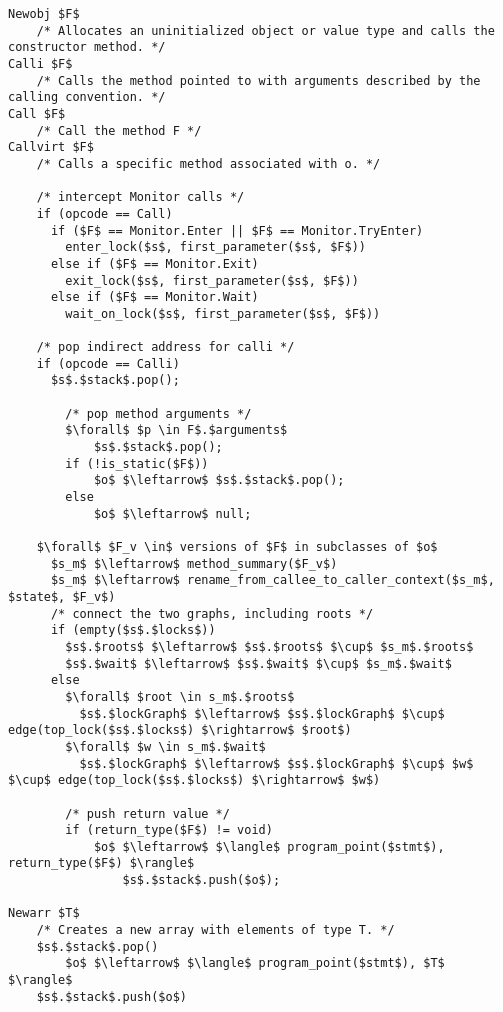 \begin{lstlisting}[language=CSharp,mathescape,caption=Data-flow rules for calls and object creation,label=fig:rulesCallAndNew,float]
Newobj $F$
    /* Allocates an uninitialized object or value type and calls the constructor method. */
Calli $F$
    /* Calls the method pointed to with arguments described by the calling convention. */
Call $F$
    /* Call the method F */
Callvirt $F$
    /* Calls a specific method associated with o. */

    /* intercept Monitor calls */
    if (opcode == Call)
      if ($F$ == Monitor.Enter || $F$ == Monitor.TryEnter)
        enter_lock($s$, first_parameter($s$, $F$))
      else if ($F$ == Monitor.Exit)
        exit_lock($s$, first_parameter($s$, $F$))
      else if ($F$ == Monitor.Wait)
        wait_on_lock($s$, first_parameter($s$, $F$))

    /* pop indirect address for calli */
    if (opcode == Calli)
      $s$.$stack$.pop();
        
		/* pop method arguments */
		$\forall$ $p \in F$.$arguments$
			$s$.$stack$.pop();
		if (!is_static($F$))
			$o$ $\leftarrow$ $s$.$stack$.pop();
		else
			$o$ $\leftarrow$ null;

    $\forall$ $F_v \in$ versions of $F$ in subclasses of $o$
      $s_m$ $\leftarrow$ method_summary($F_v$)
      $s_m$ $\leftarrow$ rename_from_callee_to_caller_context($s_m$, $state$, $F_v$) 
      /* connect the two graphs, including roots */
      if (empty($s$.$locks$))
        $s$.$roots$ $\leftarrow$ $s$.$roots$ $\cup$ $s_m$.$roots$
        $s$.$wait$ $\leftarrow$ $s$.$wait$ $\cup$ $s_m$.$wait$
      else
        $\forall$ $root \in s_m$.$roots$
          $s$.$lockGraph$ $\leftarrow$ $s$.$lockGraph$ $\cup$ edge(top_lock($s$.$locks$) $\rightarrow$ $root$)
        $\forall$ $w \in s_m$.$wait$
          $s$.$lockGraph$ $\leftarrow$ $s$.$lockGraph$ $\cup$ $w$ $\cup$ edge(top_lock($s$.$locks$) $\rightarrow$ $w$)
				
		/* push return value */
		if (return_type($F$) != void)
    		$o$ $\leftarrow$ $\langle$ program_point($stmt$), return_type($F$) $\rangle$
				$s$.$stack$.push($o$);

Newarr $T$
    /* Creates a new array with elements of type T. */
    $s$.$stack$.pop()
		$o$ $\leftarrow$ $\langle$ program_point($stmt$), $T$ $\rangle$
    $s$.$stack$.push($o$)
\end{lstlisting}

